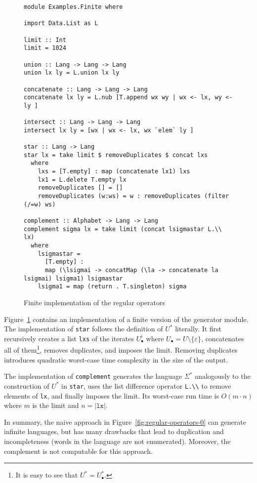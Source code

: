\begin{figure}[tp]
\begin{lstlisting}
module Examples.Finite where

import Data.List as L

limit :: Int
limit = 1024

union :: Lang -> Lang -> Lang
union lx ly = L.union lx ly

concatenate :: Lang -> Lang -> Lang
concatenate lx ly = L.nub [T.append wx wy | wx <- lx, wy <- ly ]

intersect :: Lang -> Lang -> Lang
intersect lx ly = [wx | wx <- lx, wx `elem` ly ]

star :: Lang -> Lang
star lx = take limit $ removeDuplicates $ concat lxs
  where
    lxs = [T.empty] : map (concatenate lx1) lxs
    lx1 = L.delete T.empty lx
    removeDuplicates [] = []
    removeDuplicates (w:ws) = w : removeDuplicates (filter (/=w) ws)

complement :: Alphabet -> Lang -> Lang
complement sigma lx = take limit (concat lsigmastar L.\\ lx) 
  where
    lsigmastar =
      [T.empty] : 
      map (\lsigmai -> concatMap (\la -> concatenate la lsigmai) lsigma1) lsigmastar
    lsigma1 = map (return . T.singleton) sigma
\end{lstlisting}
  \caption{Finite implementation of the regular operators}
  \label{fig:finite-regular-operators}
\end{figure}
Figure~\ref{fig:finite-regular-operators} contains an implementation
of a finite version of the generator module. The implementation of
\texttt{star} follows the definition of $U^*$ literally. It first
recursively creates a list \texttt{lxs} of the iterates $U_\bullet^i$ where
$U_\bullet = U \setminus \{\varepsilon\}$, concatenates all of
them\footnote{It is easy to see that $U^* = U_\bullet^*$.}, removes
duplicates, and imposes the limit. Removing duplicates introduces quadratic
worst-case time complexity in the size of the output.

The implementation of \texttt{complement} generates the language
$\Sigma^*$ analogously to the construction of $U^*$ in
\texttt{star}, uses the list difference operator
\texttt{L.\textbackslash\textbackslash} to remove elements of
\texttt{lx}, and finally imposes the limit. Its worst-case run time is
$O(m\cdot n)$ where $m$ is the limit and $n = |\texttt{lx}|$.

In summary, the naive approach in
Figure~\ref{fig:regular-operators-0} can generate infinite languages,
but has many drawbacks that lead to duplication and incompleteness
(words in the language are not enumerated). Moreover, the complement
is not computable for this approach.

